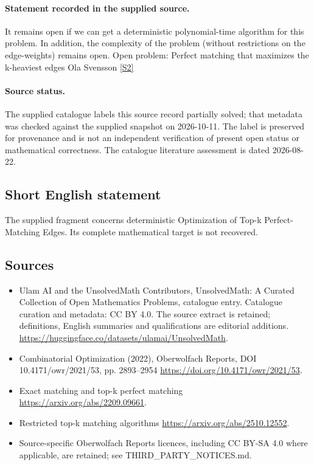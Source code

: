 \documentclass[11pt]{article}
\newcommand{\sref}[2]{\hyperlink{source:#1:#2}{[S#2]}}
\begin{document}
\paragraph{Statement recorded in the supplied source.}
It remains open if we can get a deterministic polynomial-time algorithm for this problem. In addition, the complexity of the problem (without restrictions on the edge-weights) remains open. Open problem: Perfect matching that maximizes the k-heaviest edges Ola Svensson \sref{statement}{2}
\paragraph{Source status.}
The supplied catalogue labels this source record partially solved; that metadata was checked against the supplied snapshot on 2026-10-11. The label is preserved for provenance and is not an independent verification of present open status or mathematical correctness. The catalogue literature assessment is dated 2026-08-22.
\subsection{Short English statement}
The supplied fragment concerns deterministic Optimization of Top-k Perfect-Matching Edges. Its complete mathematical target is not recovered.
\subsection{Sources}
\begin{itemize}
\item[\hypertarget{source:statement:1}{S1}] Ulam AI and the UnsolvedMath Contributors, UnsolvedMath: A Curated Collection of Open Mathematics Problems, catalogue entry. Catalogue curation and metadata: CC BY 4.0. The source extract is retained; definitions, English summaries and qualifications are editorial additions.
\url{https://huggingface.co/datasets/ulamai/UnsolvedMath}.
\item[\hypertarget{source:statement:2}{S2}] Combinatorial Optimization (2022), Oberwolfach Reports, DOI 10.4171/owr/2021/53, pp. 2893--2954
\url{https://doi.org/10.4171/owr/2021/53}.
\item[\hypertarget{source:statement:3}{S3}] Exact matching and top-k perfect matching
\url{https://arxiv.org/abs/2209.09661}.
\item[\hypertarget{source:statement:4}{S4}] Restricted top-k matching algorithms
\url{https://arxiv.org/abs/2510.12552}.
\item Source-specific Oberwolfach Reports licences, including CC BY-SA 4.0 where applicable, are retained; see THIRD\_PARTY\_NOTICES.md.
\end{itemize}
\end{document}
